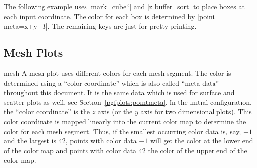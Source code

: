 {The following example uses |mark=cube*| and |z buffer=sort| to place boxes at each input coordinate. The color for each box is determined by |point meta={x+y+3}|. The remaining keys are just for pretty printing.
\pgfplotsexpensiveexample
\begin{codeexample}[]
\end{codeexample}


\subsection{Mesh Plots}
\label{sec:2d:mesh}
\begin{plottype}[/pgfplots]{mesh}
	A mesh plot uses different colors for each mesh segment. The color is determined using a ``color coordinate'' which is also called ``meta data'' throughout this document. It is the same data which is used for surface and scatter plots as well, see Section~\ref{pgfplots:pointmeta}. In the initial configuration, the ``color coordinate'' is the $z$ axis (or the $y$ axis for two dimensional plots). This color coordinate is mapped linearly into the current color map to determine the color for each mesh segment. Thus, if the smallest occurring color data is, say, $-1$ and the largest is $42$, points with color data $-1$ will get the color at the lower end of the color map and points with color data $42$ the color of the upper end of the color map.


\end{plottype}}
